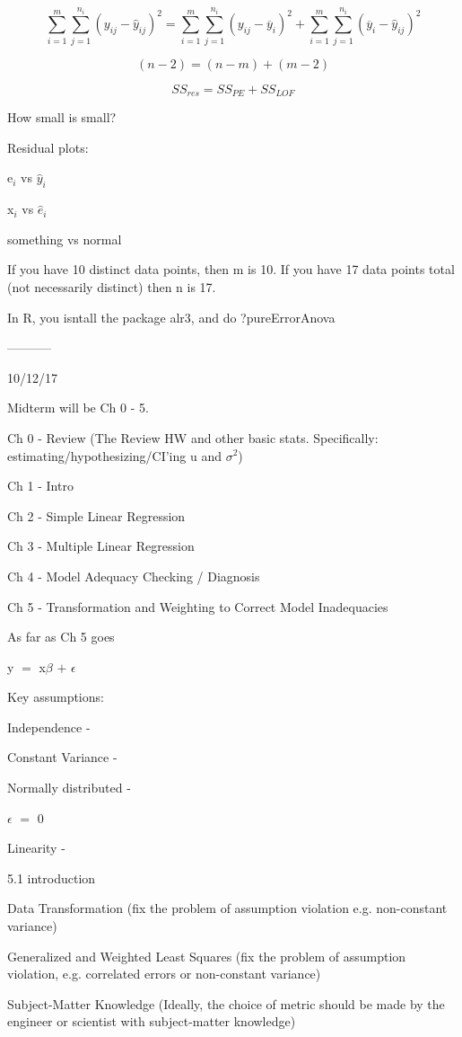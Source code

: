 \documentclass[10pt]{extarticle}
\newcommand{\mt}[1]{\ensuremath{#1}}
\newcommand{\ep}{\mt{\epsilon} }         %
\newcommand{\bta}{\mt{\beta} }
\newcommand{\ps}{\mt{\operatorname{+}} }
\newcommand{\eql}{ \mt{\operatorname{=}} }
\newcommand{\uw}[2]{#1\mt{_{#2}}}
\newcommand{\eqn}[1]{\[#1\]}
\newcommand{\txt}[1]{\text{#1}} %
\newcommand{\mn}[1]{\mt{\overline{#1}}}
\newcommand{\ssq}{\mt{\sigma^2}}
\newcommand{\exv}[1]{\txt{E[}#1\txt{]}}
\begin{document}
\eqn{\sum_{i = 1}^m\sum_{j = 1}^{n_i} (y_{ij} - \hat y_{ij})^2 = \sum_{i = 1}^m\sum_{j = 1}^{n_i} (y_{ij} - \mn{y}_{i})^2 + \sum_{i = 1}^m\sum_{j = 1}^{n_i} (\mn{y}_{i} - \hat y_{ij})^2}

\eqn{(n - 2) = (n - m) + (m - 2)}

\eqn{SS_{res} = SS_{PE} + SS_{LOF}}

How small is small?

Residual plots:

\uw{e}{i} vs $\hat y_i$

\uw{x}{i} vs $\hat e_i$

something vs normal 

If you have 10 distinct data points, then m is 10. If you have 17 data points total (not necessarily distinct) then n is 17.

In R, you isntall the package alr3, and do ?pureErrorAnova

-----------

10/12/17

Midterm will be Ch 0 - 5. 

Ch 0 - Review (The Review HW and other basic stats. Specifically: estimating/hypothesizing/CI'ing u and \ssq)

Ch 1 - Intro

Ch 2 - Simple Linear Regression

Ch 3 - Multiple Linear Regression

Ch 4 - Model Adequacy Checking / Diagnosis

Ch 5 - Transformation and Weighting to Correct Model Inadequacies

As far as Ch 5 goes

y \eql x\bta \ps \ep

Key assumptions:

Independence - 

Constant Variance -

Normally distributed - 

\exv{\ep} \eql 0

Linearity - 

5.1 introduction

Data Transformation (fix the problem of assumption violation e.g. non-constant variance)

Generalized and Weighted Least Squares (fix the problem of assumption violation, e.g. correlated errors or non-constant variance)

Subject-Matter Knowledge (Ideally, the choice of metric should be made by the engineer or scientist with subject-matter knowledge)
\end{document}
